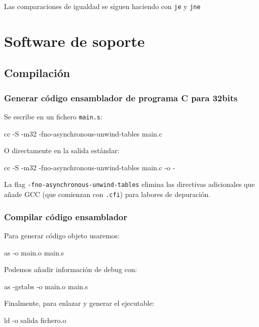 \documentclass[11pt]{scrartcl}
\begin{document}
Las comparaciones de igualdad se siguen haciendo con \texttt{je} y \texttt{jne}

\pagebreak

\section{Software de soporte}

\subsection{Compilación}

\subsubsection{Generar código ensamblador de programa C para 32bits}
Se escribe en un fichero \texttt{main.s}:

\begin{bashcode}
cc -S -m32 -fno-asynchronous-unwind-tables main.c  
\end{bashcode}

O directamente en la salida estándar:
\begin{bashcode}
cc -S -m32 -fno-asynchronous-unwind-tables main.c -o -
\end{bashcode}

La flag \texttt{-fno-asynchronous-unwind-tables} elimina las directivas
adicionales que añade GCC (que comienzan con \texttt{.cfi}) para labores de
depuración.

\subsubsection{Compilar código ensamblador}

Para generar código objeto usaremos:

\begin{bashcode}
as -o main.o main.s  
\end{bashcode}

Podemos añadir información de debug con:

\begin{bashcode}
as -gstabs -o main.o main.s  
\end{bashcode}

Finalmente, para enlazar y generar el ejecutable:

\begin{bashcode}
ld -o salida fichero.o  
\end{bashcode}
\end{document}
